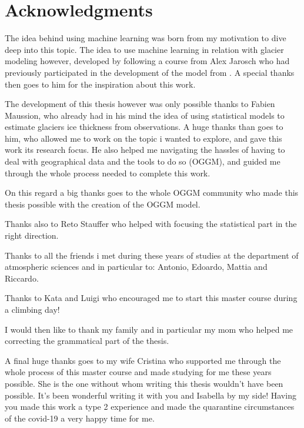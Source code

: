 \chapter*{Acknowledgments}
\thispagestyle{plain}
The idea behind using machine learning was born from my motivation to dive deep into this topic. The idea to use machine learning in relation with glacier modeling however, developed by following a course from Alex Jarosch who had previously participated in the development of the model from \citet{Clarke2009}. A special thanks then goes to him for the inspiration about this work.

The development of this thesis however was only possible thanks to Fabien Maussion, who already had in his mind the idea of using statistical models to estimate glaciers ice thickness from observations. A huge thanks than goes to him, who allowed me to work on the topic i wanted to explore, and gave this work its research focus. He also helped me navigating the hassles of having to deal with geographical data and the tools to do so (OGGM), and guided me through the whole process needed to complete this work. 

On this regard a big thanks goes to the whole OGGM community who made this thesis possible with the creation of the OGGM model.

Thanks also to Reto Stauffer who helped with focusing the statistical part in the right direction.
\newline

Thanks to all the friends i met during these years of studies at the department of atmospheric sciences and in particular to: Antonio, Edoardo, Mattia and Riccardo.

Thanks to Kata and Luigi who encouraged me to start this master course during a climbing day!
\newline

I would then like to thank my family and in particular my mom who helped me correcting the grammatical part of the thesis. 

A final huge thanks goes to my wife Cristina who supported me through the whole process of this master course and made studying for me these years possible. She is the one without whom writing this thesis wouldn't have been possible. It's been wonderful writing it with you and Isabella by my side! Having you made this work a type 2 experience and made the quarantine circumstances of the covid-19 a very happy time for me.

